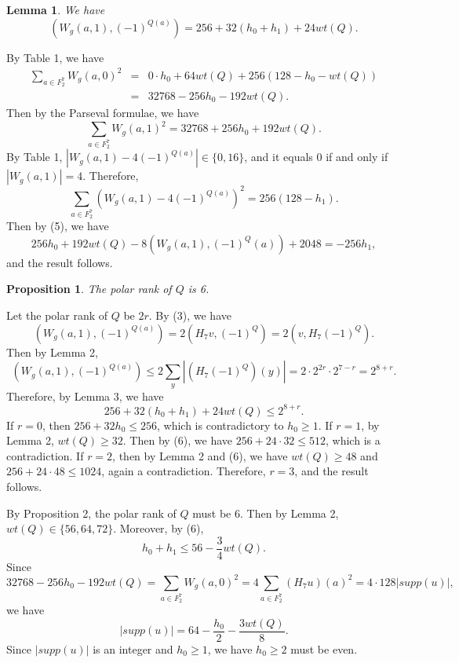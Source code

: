 \documentclass[11pt]{article}
\newtheorem{lemma}{Lemma}
\newtheorem{proposition}{Proposition}
\newtheorem{open problem}{Open problem}
\begin{document}
\begin{lemma} We have
\begin{equation}
(W_g(a,1), (-1)^{Q(a)})=256+32(h_0+h_1)+24wt(Q).
\end{equation}
\end{lemma}
\proof By Table 1, we have
\begin{eqnarray*}
\sum_{a\in F_2^7} W_g(a,0)^2&=&0\cdot h_0+64wt(Q)+256(128-h_0-wt(Q))\\
&=& 32768-256h_0-192wt(Q).
\end{eqnarray*}
Then by the Parseval formulae, we have
\begin{equation}
\sum_{a\in F_2^7} W_g(a,1)^2=32768+256h_0+192wt(Q).
\end{equation}
By Table 1, $|W_g(a,1)-4(-1)^{Q(a)}|\in \{0,16\}$, and it equals 0 if and only if $|W_g(a,1)|=4$. Therefore,
\[
\sum_{a\in F_2^7} (W_g(a,1)-4(-1)^{Q(a)})^2=256(128-h_1).
\]
Then by (5), we have
\[
256h_0+192wt(Q)-8(W_g(a,1), (-1)^Q(a))+2048=-256h_1,
\]
and the result follows.
\endproof

\begin{proposition} The polar rank of $Q$ is 6.
\end{proposition}
\proof Let the polar rank of $Q$ be $2r$. By (3), we have
\[
(W_g(a,1), (-1)^{Q(a)})=2(H_7v,(-1)^Q)=2(v,H_7(-1)^Q).
\]
Then by Lemma 2,
\[
(W_g(a,1), (-1)^{Q(a)})\le 2\sum_{y}|(H_7(-1)^Q)(y)|=2\cdot2^{2r}\cdot 2^{7-r}=2^{8+r}.
\]
Therefore, by Lemma 3, we have
\begin{equation}
256+32(h_0+h_1)+24wt(Q)\le 2^{8+r}.
\end{equation}
If $r=0$, then $256+32h_0\le 256$, which is contradictory to $h_0\ge 1$. If $r=1$, by Lemma 2, $wt(Q)\ge 32$. Then by (6), we have $256+24\cdot 32\le 512$, which is a contradiction. If $r=2$, then by Lemma 2 and (6), we have $wt(Q)\ge 48$ and $256+24\cdot 48\le 1024$, again a contradiction. Therefore, $r=3$, and the result follows.
\endproof

By Proposition 2, the polar rank of $Q$ must be 6. Then by Lemma 2, $wt(Q)\in\{56,64,72\}$. Moreover, by (6),
\begin{equation}
h_0+h_1\le 56-\frac{3}{4}wt(Q).
\end{equation}
Since
\[
32768-256h_0-192wt(Q)=\sum_{a\in F_2^7}W_g(a,0)^2=4\sum_{a\in F_2^7}(H_7u)(a)^2=4\cdot 128|supp(u)|,
\]
we have
\begin{equation}
|supp(u)|=64-\frac{h_0}{2}-\frac{3wt(Q)}{8}.
\end{equation}
Since $|supp(u)|$ is an integer and $h_0\ge 1$, we have $h_0\ge 2$ must be even.
\end{document}
